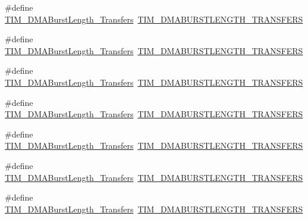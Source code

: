 \begin{DoxyCompactItemize}
\item 
\#define \hyperlink{group___h_a_l___t_i_m___aliased___defines_ga2fc09f2148cf6ebddc8e67116212259c}{T\+I\+M\+\_\+\+D\+M\+A\+Burst\+Length\+\_\+Transfers}~\hyperlink{group___t_i_m___d_m_a___burst___length_ga793a89bb8a0669e274de451985186c53}{T\+I\+M\+\_\+\+D\+M\+A\+B\+U\+R\+S\+T\+L\+E\+N\+G\+T\+H\+\_\+T\+R\+A\+N\+S\+F\+E\+RS}
\item 
\#define \hyperlink{group___h_a_l___t_i_m___aliased___defines_ga0ca63a3caeaf1e85bd54961891949de7}{T\+I\+M\+\_\+\+D\+M\+A\+Burst\+Length\+\_\+Transfers}~\hyperlink{group___t_i_m___d_m_a___burst___length_ga79ab58b6a3b30c54c0758b381df22cb0}{T\+I\+M\+\_\+\+D\+M\+A\+B\+U\+R\+S\+T\+L\+E\+N\+G\+T\+H\+\_\+T\+R\+A\+N\+S\+F\+E\+RS}
\item 
\#define \hyperlink{group___h_a_l___t_i_m___aliased___defines_ga9160d52913bbd7ad1e663ff943d01852}{T\+I\+M\+\_\+\+D\+M\+A\+Burst\+Length\+\_\+Transfers}~\hyperlink{group___t_i_m___d_m_a___burst___length_gaf52962b501b3a76d89df6274ed425947}{T\+I\+M\+\_\+\+D\+M\+A\+B\+U\+R\+S\+T\+L\+E\+N\+G\+T\+H\+\_\+T\+R\+A\+N\+S\+F\+E\+RS}
\item 
\#define \hyperlink{group___h_a_l___t_i_m___aliased___defines_ga11485e9eee8a6a7edc1df868755eab85}{T\+I\+M\+\_\+\+D\+M\+A\+Burst\+Length\+\_\+Transfers}~\hyperlink{group___t_i_m___d_m_a___burst___length_ga06a81eba628bea6495d86ebcc6021da0}{T\+I\+M\+\_\+\+D\+M\+A\+B\+U\+R\+S\+T\+L\+E\+N\+G\+T\+H\+\_\+T\+R\+A\+N\+S\+F\+E\+RS}
\item 
\#define \hyperlink{group___h_a_l___t_i_m___aliased___defines_gab1a097ca7404e518839df99795443fb0}{T\+I\+M\+\_\+\+D\+M\+A\+Burst\+Length\+\_\+Transfers}~\hyperlink{group___t_i_m___d_m_a___burst___length_ga5f430b76c0aeded0a8d8be779f26ae52}{T\+I\+M\+\_\+\+D\+M\+A\+B\+U\+R\+S\+T\+L\+E\+N\+G\+T\+H\+\_\+T\+R\+A\+N\+S\+F\+E\+RS}
\item 
\#define \hyperlink{group___h_a_l___t_i_m___aliased___defines_gad13373f5fd246557a4fc487dc43c37ec}{T\+I\+M\+\_\+\+D\+M\+A\+Burst\+Length\+\_\+Transfers}~\hyperlink{group___t_i_m___d_m_a___burst___length_ga98a4d88c533178bc1b4347e4c5ce815a}{T\+I\+M\+\_\+\+D\+M\+A\+B\+U\+R\+S\+T\+L\+E\+N\+G\+T\+H\+\_\+T\+R\+A\+N\+S\+F\+E\+RS}
\item 
\#define \hyperlink{group___h_a_l___t_i_m___aliased___defines_gafb644e6033f7b46c602b02754b69fde0}{T\+I\+M\+\_\+\+D\+M\+A\+Burst\+Length\+\_\+Transfers}~\hyperlink{group___t_i_m___d_m_a___burst___length_gaf4b2a1fe12c52272544c21e17de1ed90}{T\+I\+M\+\_\+\+D\+M\+A\+B\+U\+R\+S\+T\+L\+E\+N\+G\+T\+H\+\_\+T\+R\+A\+N\+S\+F\+E\+RS}

\end{DoxyCompactItemize}
